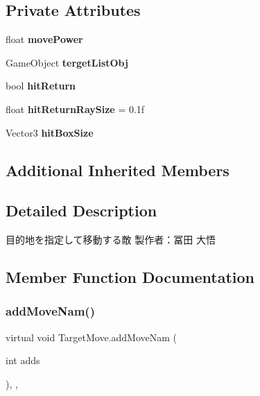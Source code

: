 \subsection*{Private Attributes}
\begin{DoxyCompactItemize}
\item 
\mbox{\label{class_target_move_a68fb5ca9b153f64e44e109e34392d68b}} 
float {\bfseries move\+Power}
\item 
\mbox{\label{class_target_move_a9233d58fb2d171cc7dce6482cef2d8e1}} 
Game\+Object {\bfseries terget\+List\+Obj}
\item 
\mbox{\label{class_target_move_a38244475f0c1826843083ff5636de8ca}} 
bool {\bfseries hit\+Return}
\item 
\mbox{\label{class_target_move_af1a9c4efbb8456c379b1f782f25db27a}} 
float {\bfseries hit\+Return\+Ray\+Size} = 0.\+1f
\item 
\mbox{\label{class_target_move_a29e841b1e8f8cc9aecb4109b7ca8c8e9}} 
Vector3 {\bfseries hit\+Box\+Size}
\end{DoxyCompactItemize}
\subsection*{Additional Inherited Members}


\subsection{Detailed Description}
目的地を指定して移動する敵 製作者：冨田 大悟 



\subsection{Member Function Documentation}
\mbox{\label{class_target_move_ace85a95cffab1a4ce3f782c9be95248c}} 
\subsubsection{\texorpdfstring{add\+Move\+Nam()}{addMoveNam()}}
{\footnotesize\ttfamily virtual void Target\+Move.\+add\+Move\+Nam (\begin{DoxyParamCaption}\item[{int}]{adds }\end{DoxyParamCaption})\hspace{0.3cm}{\ttfamily [inline]}, {\ttfamily [protected]}, {\ttfamily [virtual]}}



